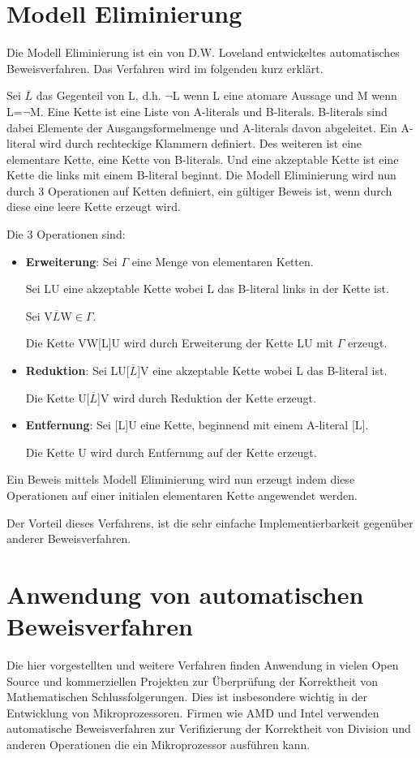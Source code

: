 \section{Modell Eliminierung}
Die Modell Eliminierung ist ein von D.W. Loveland entwickeltes automatisches Beweisverfahren. Das Verfahren wird im folgenden kurz erklärt.

Sei $\overline{L}$ das Gegenteil von L, d.h. $\neg$L wenn L eine atomare Aussage und M wenn L=$\neg$M. Eine Kette ist eine Liste von A-literals und B-literals. B-literals sind dabei Elemente der Ausgangsformelmenge und A-literals davon abgeleitet. Ein A-literal wird durch rechteckige Klammern definiert. Des weiteren ist eine elementare Kette, eine Kette von B-literals. Und eine akzeptable Kette ist eine Kette die links mit einem B-literal beginnt. Die Modell Eliminierung wird nun durch 3 Operationen auf Ketten definiert, ein gültiger Beweis ist, wenn durch diese eine leere Kette erzeugt wird. \cite{model_elimination}

Die 3 Operationen sind:
\begin{itemize}
\item \textbf{Erweiterung}: Sei $\Gamma$ eine Menge von elementaren Ketten.

Sei LU eine akzeptable Kette wobei L das B-literal links in der Kette ist.

Sei V$\overline{L}$W$\in \Gamma$.

Die Kette VW[L]U wird durch Erweiterung der Kette LU mit $\Gamma$ erzeugt.

\item \textbf{Reduktion}: Sei LU[$\overline{L}$]V eine akzeptable Kette wobei L das B-literal ist.

Die Kette U[$\overline{L}$]V wird durch Reduktion der Kette erzeugt.

\item \textbf{Entfernung}: Sei [L]U eine Kette, beginnend mit einem A-literal [L].

Die Kette U wird durch Entfernung auf der Kette erzeugt.
\end{itemize}

Ein Beweis mittels Modell Eliminierung wird nun erzeugt indem diese Operationen auf einer initialen elementaren Kette angewendet werden.

Der Vorteil dieses Verfahrens, ist die sehr einfache Implementierbarkeit gegenüber anderer Beweisverfahren.

\section{Anwendung von automatischen Beweisverfahren}
Die hier vorgestellten und weitere Verfahren finden Anwendung in vielen Open Source und kommerziellen Projekten zur Überprüfung der Korrektheit von Mathematischen Schlussfolgerungen. Dies ist insbesondere wichtig in der Entwicklung von Mikroprozessoren. Firmen wie AMD und Intel verwenden automatische Beweisverfahren zur Verifizierung der Korrektheit von Division und anderen Operationen die ein Mikroprozessor ausführen kann.


